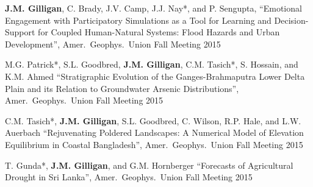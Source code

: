     \item \textbf{J.M. Gilligan}, C. Brady, J.V. Camp, J.J. Nay*, and P. Sengupta,
    \enquote{Emotional Engagement with Participatory Simulations as a Tool for Learning and Decision-Support for Coupled Human-Natural Systems: Flood Hazards and Urban Development},
    Amer.\ Geophys.\ Union Fall Meeting 2015

    \item M.G. Patrick*, S.L. Goodbred, \textbf{J.M. Gilligan}, C.M. Tasich*, S. Hossain, and K.M. Ahmed
    \enquote{Stratigraphic Evolution of the Ganges-Brahmaputra Lower Delta Plain and its Relation to Groundwater Arsenic Distributions},
    Amer.\ Geophys.\ Union Fall Meeting 2015

    \item C.M. Tasich*, \textbf{J.M. Gilligan}, S.L. Goodbred, C. Wilson, R.P. Hale, and L.W. Auerbach
    \enquote{Rejuvenating Poldered Landscapes: A Numerical Model of Elevation Equilibrium in Coastal Bangladesh},
    Amer.\ Geophys.\ Union Fall Meeting 2015

    \item T. Gunda*, \textbf{J.M. Gilligan}, and G.M. Hornberger
    \enquote{Forecasts of Agricultural Drought in Sri Lanka},
    Amer.\ Geophys.\ Union Fall Meeting 2015
